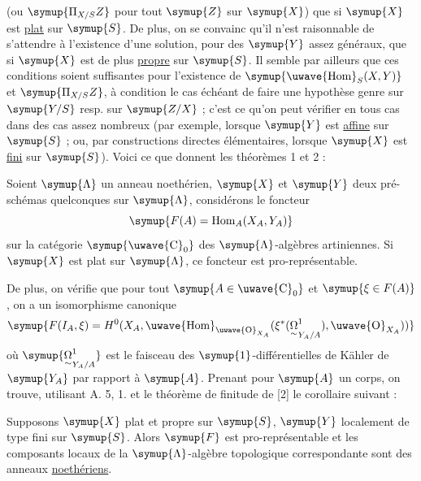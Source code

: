 (ou $\symup{\Pi_{X/S}Z}$ pour tout $\symup{Z}$ sur $\symup{X}$) que si $\symup{X}$ est \uline{plat} sur $\symup{S}$. De plus,
on se convainc qu'il n'est raisonnable de s'attendre à l'existence d'une
solution, pour des $\symup{Y}$ assez généraux, que si $\symup{X}$ est de plus \uline{propre} sur $\symup{S}$.
Il semble par ailleurs que ces conditions soient suffisantes pour l'existence
de $\symup{\text{\uwave{Hom}}_S(X,Y)}$ et $\symup{\Pi_{X/S}Z}$, à condition le
cas échéant de faire une hypothèse genre  sur $\symup{Y/S}$ resp.
sur $\symup{Z/X}$ ; c'est ce qu'on peut vérifier en tous cas dans des cas assez
nombreux (par exemple, lorsque $\symup{Y}$ est \uline{affine} sur $\symup{S}$ ; ou, par constructions
directes élémentaires, lorsque $\symup{X}$ est \uline{fini} sur $\symup{S}$). Voici ce que donnent les
théorèmes 1 et 2 :

 Soient $\symup{\Lambda}$ un anneau noethérien, $\symup{X}$ et $\symup{Y}$
deux pré-schémas quelconques sur $\symup{\Lambda}$, considérons le foncteur
\[
  \symup{F(A)=\operatorname{Hom}_A(X_A,Y_A)}
\]
sur la catégorie $\symup{\text{\uwave{C}}_0}$ des $\symup{\Lambda}$-algèbres artiniennes. Si $\symup{X}$ est
plat sur $\symup{\Lambda}$, ce foncteur est pro-représentable.

De plus, on vérifie que pour tout $\symup{A\in\text{\uwave{C}}_0}$ et $\symup{\xi\in F(A)}$, on a un
isomorphisme canonique
\[
  \symup{F(I_A,\xi)=H^0(X_A,\text{\uwave{Hom}}_{\text{\uwave{O}}_{X_A}}(\xi^*(\mathord{\underset{\sim}{\Omega}}^1_{Y_A/A}),\text{\uwave{O}}_{X_A}))}
\]
où $\symup{\mathord{\underset{\sim}{\Omega}}^1_{Y_A/A}}$ est le faisceau des $\symup{1}$-différentielles de Kähler de
$\symup{Y_A}$ par rapport à $\symup{A}$. Prenant pour $\symup{A}$ un corps, on trouve, utilisant
A. 5, 1. et le théorème de finitude de [2] le corollaire suivant :

 Supposons $\symup{X}$ plat et propre sur $\symup{S}$, $\symup{Y}$ localement de
type fini sur $\symup{S}$. Alors $\symup{F}$ est pro-représentable et les composants locaux de
la $\symup{\Lambda}$-algèbre topologique correspondante sont des anneaux \uline{noethériens}.

